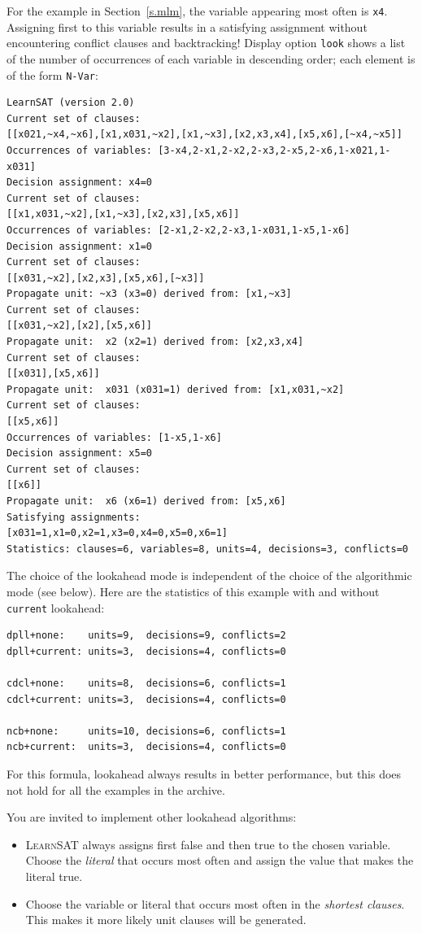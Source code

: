 \documentclass[11pt]{report}
\newcommand*{\p}[1]{\textup{\texttt{#1}}}
\newcommand*{\ls}{\textsc{LearnSAT}}
\begin{document}
For the example in Section~\ref{s.mlm}, the variable appearing most often is \p{x4}. Assigning first to this variable results in a satisfying assignment without encountering conflict clauses and backtracking! Display option \p{look} shows a list of the number of occurrences of each variable in descending order; each element is of the form \p{N-Var}:
\begin{verbatim}
LearnSAT (version 2.0)
Current set of clauses:
[[x021,~x4,~x6],[x1,x031,~x2],[x1,~x3],[x2,x3,x4],[x5,x6],[~x4,~x5]]
Occurrences of variables: [3-x4,2-x1,2-x2,2-x3,2-x5,2-x6,1-x021,1-x031]
Decision assignment: x4=0
Current set of clauses:
[[x1,x031,~x2],[x1,~x3],[x2,x3],[x5,x6]]
Occurrences of variables: [2-x1,2-x2,2-x3,1-x031,1-x5,1-x6]
Decision assignment: x1=0
Current set of clauses:
[[x031,~x2],[x2,x3],[x5,x6],[~x3]]
Propagate unit: ~x3 (x3=0) derived from: [x1,~x3]
Current set of clauses:
[[x031,~x2],[x2],[x5,x6]]
Propagate unit:  x2 (x2=1) derived from: [x2,x3,x4]
Current set of clauses:
[[x031],[x5,x6]]
Propagate unit:  x031 (x031=1) derived from: [x1,x031,~x2]
Current set of clauses:
[[x5,x6]]
Occurrences of variables: [1-x5,1-x6]
Decision assignment: x5=0
Current set of clauses:
[[x6]]
Propagate unit:  x6 (x6=1) derived from: [x5,x6]
Satisfying assignments:
[x031=1,x1=0,x2=1,x3=0,x4=0,x5=0,x6=1]
Statistics: clauses=6, variables=8, units=4, decisions=3, conflicts=0
\end{verbatim}

\pagebreak[3]

The choice of the lookahead mode is independent of the choice of the algorithmic mode (see below). Here are the statistics of this example with and without \p{current} lookahead:
\begin{verbatim}
dpll+none:    units=9,  decisions=9, conflicts=2
dpll+current: units=3,  decisions=4, conflicts=0

cdcl+none:    units=8,  decisions=6, conflicts=1
cdcl+current: units=3,  decisions=4, conflicts=0

ncb+none:     units=10, decisions=6, conflicts=1
ncb+current:  units=3,  decisions=4, conflicts=0
\end{verbatim}
For this formula, lookahead always results in better performance, but this does not hold for all the examples in the archive.

You are invited to implement other lookahead algorithms:
\begin{itemize}
\item \ls{} always assigns first false and then true to the chosen variable. Choose the \emph{literal} that occurs most often and assign the value that makes the literal true.
\item Choose the variable or literal that occurs most often in the \emph{shortest clauses}. This makes it more likely unit clauses will be generated.
\end{itemize}
\end{document}
